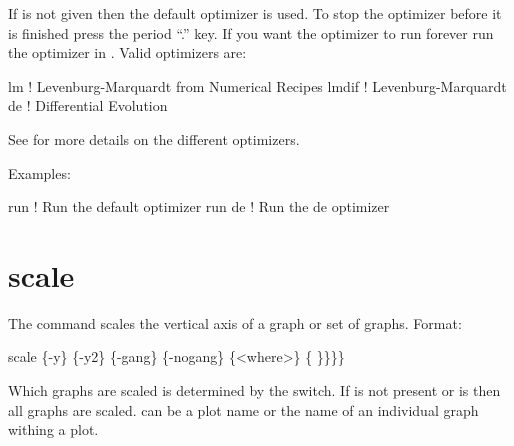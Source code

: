 \vskip 0.2in 

If  is not given then the default optimizer is
used. To stop the optimizer before it is finished press the period
``.''  key. If you want the optimizer to run forever run the optimizer
in . Valid optimizers are:
\begin{example}
  lm            ! Levenburg-Marquardt from Numerical Recipes 
  lmdif         ! Levenburg-Marquardt 
  de            ! Differential Evolution
\end{example}
See  for more details on the different
optimizers.

Examples:
\begin{example}
  run         ! Run the default optimizer
  run de      ! Run the de optimizer
\end{example}

\section{scale}
\label{s:scale}

The  command scales the vertical axis of a graph or set of graphs.
Format:
\begin{example}
  scale \{-y\} \{-y2\} \{-gang\} \{-nogang\} \{<where>\} \{<value1> \}<value2>\}\}\}
\end{example}

Which graphs are scaled is determined by the  switch. If
 is not present or  is  then all
graphs are scaled.  can be a plot name or the name of an
individual graph withing a plot.

